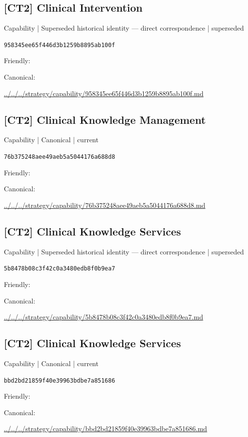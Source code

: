 \documentclass[10pt,a4paper]{article}
\begin{document}
\subsection*{[CT2] Clinical Intervention}
{\small Capability | Superseded historical identity — direct correspondence | superseded}\par
\texttt{958345ee65f446d3b1259b8895ab100f}\par
Friendly: \par
Canonical: \par
{\footnotesize\url{../../../strategy/capability/958345ee65f446d3b1259b8895ab100f.md}}\par
\subsection*{[CT2] Clinical Knowledge Management}
{\small Capability | Canonical | current}\par
\texttt{76b375248aee49aeb5a5044176a688d8}\par
Friendly: \par
Canonical: \par
{\footnotesize\url{../../../strategy/capability/76b375248aee49aeb5a5044176a688d8.md}}\par
\subsection*{[CT2] Clinical Knowledge Services}
{\small Capability | Superseded historical identity — direct correspondence | superseded}\par
\texttt{5b8478b08c3f42c0a3480edb8f0b9ea7}\par
Friendly: \par
Canonical: \par
{\footnotesize\url{../../../strategy/capability/5b8478b08c3f42c0a3480edb8f0b9ea7.md}}\par
\subsection*{[CT2] Clinical Knowledge Services}
{\small Capability | Canonical | current}\par
\texttt{bbd2bd21859f40e39963bdbe7a851686}\par
Friendly: \par
Canonical: \par
{\footnotesize\url{../../../strategy/capability/bbd2bd21859f40e39963bdbe7a851686.md}}\par
\end{document}
